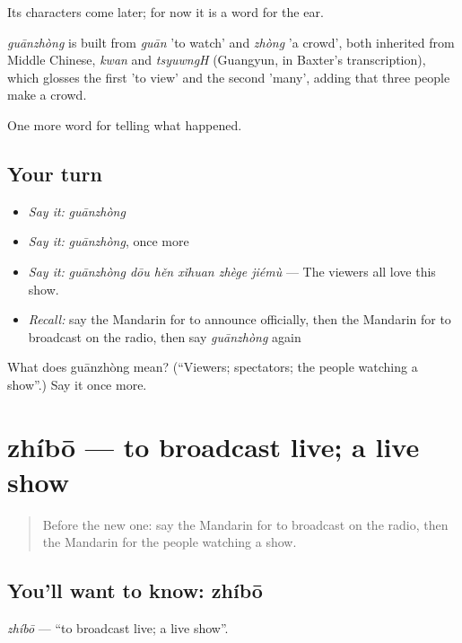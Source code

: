 Its characters come later; for now it is a word for the ear.

\begin{cousinweb}
\emph{guānzhòng} is built from \emph{guān} 'to watch' and \emph{zhòng} 'a crowd', both inherited from Middle Chinese, \emph{kwan} and \emph{tsyuwngH} (Guangyun, in Baxter's transcription), which glosses the first 'to view' and the second 'many', adding that three people make a crowd.
\end{cousinweb}

\begin{grammarlens}[title={What you've built}]
One more word for telling what happened.
\end{grammarlens}

\subsection*{Your turn}
\begin{itemize}
\raggedright
  \item \emph{Say it:} \emph{guānzhòng}
  \item \emph{Say it:} \emph{guānzhòng}, once more
  \item \emph{Say it:} \emph{guānzhòng dōu hěn xǐhuan zhège jiémù} — The viewers all love this show.
  \item \emph{Recall:} say the Mandarin for to announce officially, then the Mandarin for to broadcast on the radio, then say \emph{guānzhòng} again
\end{itemize}

\begin{tcolorbox}[breakable,colback=teal!4,colframe=teal!35!black,title={Before you move on}]
What does guānzhòng mean? (\textquotedblleft{}Viewers; spectators; the people watching a show\textquotedblright{}.) Say it once more.
\end{tcolorbox}
\section[zhíbō]{zhíbō — to broadcast live; a live show}

\label{lesson:ZH-C292-zhibo}



\begin{quote}
Before the new one: say the Mandarin for to broadcast on the radio, then the Mandarin for the people watching a show.
\end{quote}

\subsection*{You'll want to know: zhíbō}
\emph{zhíbō} — \textquotedblleft{}to broadcast live; a live show\textquotedblright{}.

